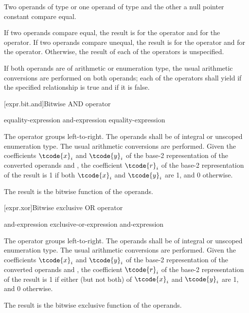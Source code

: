 \pnum
Two operands of type  or one operand of type
 and the other a null pointer constant compare equal.

\pnum
If two operands compare equal, the result is  for
the \tcode{==} operator and  for the \tcode{!=} operator. If two operands
compare unequal, the result is  for the \tcode{==} operator and
 for the \tcode{!=} operator. Otherwise, the result of each of the
operators is unspecified.

\pnum
If both operands are of arithmetic or enumeration type, the usual arithmetic
conversions are performed on both operands; each of the operators shall yield
 if the specified relationship is true and  if it is
false.

[expr.bit.and]{Bitwise AND operator}%
%
%
%
%

\begin{bnf}
\br
    equality-expression\br
    and-expression \terminal{\&} equality-expression
\end{bnf}

\pnum
The \tcode{\&} operator groups left-to-right.
The operands shall be of integral or unscoped enumeration type.
The usual arithmetic conversions are performed.
Given the coefficients $\tcode{x}_i$ and $\tcode{y}_i$
of the base-2 representation
of the converted operands  and ,
the coefficient $\tcode{r}_i$
of the base-2 representation of the result 
is 1 if both $\tcode{x}_i$ and $\tcode{y}_i$ are 1, and 0 otherwise.
\begin{note}
The result is the bitwise  function of the operands.
\end{note}

[expr.xor]{Bitwise exclusive OR operator}%
%
%

\begin{bnf}
\br
    and-expression\br
    exclusive-or-expression \terminal{\caret} and-expression
\end{bnf}

\pnum
The \tcode{\^} operator groups left-to-right.
The operands shall be of integral or unscoped enumeration type.
The usual arithmetic conversions are performed.
Given the coefficients $\tcode{x}_i$ and $\tcode{y}_i$
of the base-2 representation
of the converted operands  and ,
the coefficient $\tcode{r}_i$
of the base-2 representation of the result 
is 1 if either (but not both) of $\tcode{x}_i$ and $\tcode{y}_i$ are 1,
and 0 otherwise.
\begin{note}
The result is the bitwise exclusive  function of the operands.
\end{note}

